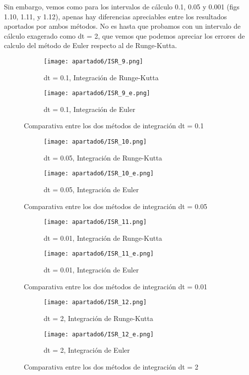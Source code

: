 Sin embargo, vemos como para los intervalos de cálculo 0.1, 0.05 y 0.001 (figs 1.10, 1.11, y 1.12), apenas hay diferencias apreciables entre los resultados aportados por ambos métodos. No es hasta que probamos con un intervalo de cálculo exagerado como dt = 2, que vemos que podemos apreciar los errores de calculo del método de Euler respecto al de Runge-Kutta.
\begin{figure}[H]
	\centering
	\begin{subfigure}[b]{0.8\textwidth}
		\centering
		\texttt{[image: apartado6/ISR\_9.png]}
		\caption{dt = 0.1, Integración de Runge-Kutta}
	\end{subfigure}
	\hfill
	\begin{subfigure}[b]{0.8\textwidth}
		\centering
		\texttt{[image: apartado6/ISR\_9\_e.png]}
		\caption{dt = 0.1, Integración de Euler}
	\end{subfigure}
	\caption{Comparativa entre los dos métodos de integración dt = 0.1}
\end{figure}
\begin{figure}[H]
	\centering
	\begin{subfigure}[b]{0.8\textwidth}
		\centering
		\texttt{[image: apartado6/ISR\_10.png]}
		\caption{dt = 0.05, Integración de Runge-Kutta}
	\end{subfigure}
	\hfill
	\begin{subfigure}[b]{0.8\textwidth}
		\centering
		\texttt{[image: apartado6/ISR\_10\_e.png]}
		\caption{dt = 0.05, Integración de Euler}
	\end{subfigure}
	\caption{Comparativa entre los dos métodos de integración dt = 0.05}
\end{figure}
\begin{figure}[H]
	\centering
	\begin{subfigure}[b]{0.8\textwidth}
		\centering
		\texttt{[image: apartado6/ISR\_11.png]}
		\caption{dt = 0.01, Integración de Runge-Kutta}
	\end{subfigure}
	\hfill
	\begin{subfigure}[b]{0.8\textwidth}
		\centering
		\texttt{[image: apartado6/ISR\_11\_e.png]}
		\caption{dt = 0.01, Integración de Euler}
	\end{subfigure}
	\caption{Comparativa entre los dos métodos de integración dt = 0.01}
\end{figure}
\begin{figure}[H]
	\centering
	\begin{subfigure}[b]{0.8\textwidth}
		\centering
		\texttt{[image: apartado6/ISR\_12.png]}
		\caption{dt = 2, Integración de Runge-Kutta}
	\end{subfigure}
	\hfill
	\begin{subfigure}[b]{0.8\textwidth}
		\centering
		\texttt{[image: apartado6/ISR\_12\_e.png]}
		\caption{dt = 2, Integración de Euler}
	\end{subfigure}
	\caption{Comparativa entre los dos métodos de integración dt = 2}
\end{figure}
